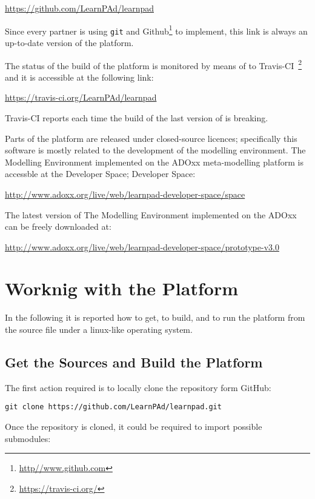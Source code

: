 \documentclass{learnpad}
\begin{document}
\url{https://github.com/LearnPAd/learnpad}

Since every partner is using \texttt{git} and 
Github\footnote{\url{http//www.github.com}} to implement, this link is
always an up-to-date version of the \learnpad platform.

The status of the build of the platform is monitored by means of to 
Travis-CI~\footnote{\url{https://travis-ci.org/}} and it is accessible at the 
following link:

\url{https://travis-ci.org/LearnPAd/learnpad}

Travis-CI reports each time the build of the last version of \learnpad is
breaking.

Parts of the \learnpad platform are released under closed-source licences; 
specifically this software is mostly related to the development of the modelling 
environment. The \learnpad Modelling Environment implemented on the ADOxx 
meta-modelling platform is accessble at the \learnpad Developer Space;
\learnpad Developer Space:
 
\url{http://www.adoxx.org/live/web/learnpad-developer-space/space}

The latest version of  The \learnpad Modelling Environment implemented on the 
ADOxx  can be freely downloaded at:

\url{http://www.adoxx.org/live/web/learnpad-developer-space/prototype-v3.0}

\chapter{Worknig with the \learnpad Platform}
\label{ch:platform}

In the following it is reported how to get, to build, and to
run the \learnpad platform from the source file under a linux-like
operating system.

\section{Get the Sources and Build the Platform}
\label{sec:build}

The first action required is to locally clone the \learnpad
repository form GitHub:

\begin{lstlisting}[style=javaCode, breaklines]
git clone https://github.com/LearnPAd/learnpad.git
\end{lstlisting}

Once the repository is cloned, it could be required to import 
possible submodules:
\end{document}
